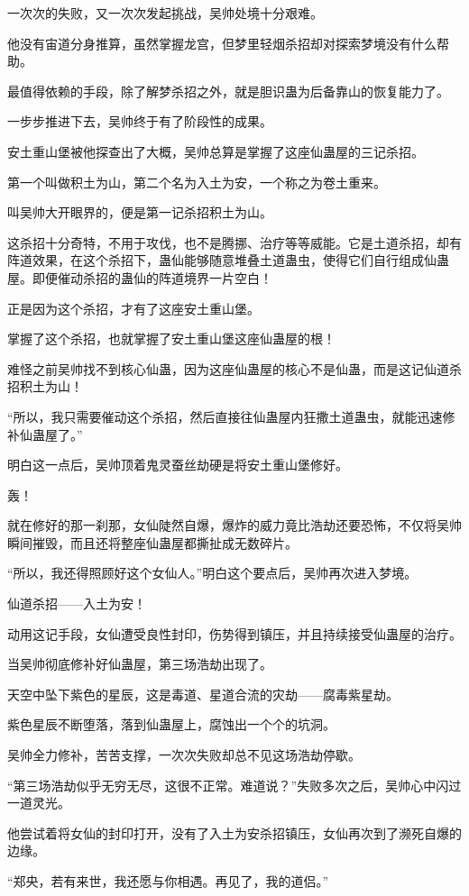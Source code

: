 \begin{this_body}
一次次的失败，又一次次发起挑战，吴帅处境十分艰难。

他没有宙道分身推算，虽然掌握龙宫，但梦里轻烟杀招却对探索梦境没有什么帮助。

最值得依赖的手段，除了解梦杀招之外，就是胆识蛊为后备靠山的恢复能力了。

一步步推进下去，吴帅终于有了阶段性的成果。

安土重山堡被他探查出了大概，吴帅总算是掌握了这座仙蛊屋的三记杀招。

第一个叫做积土为山，第二个名为入土为安，一个称之为卷土重来。

叫吴帅大开眼界的，便是第一记杀招积土为山。

这杀招十分奇特，不用于攻伐，也不是腾挪、治疗等等威能。它是土道杀招，却有阵道效果，在这个杀招下，蛊仙能够随意堆叠土道蛊虫，使得它们自行组成仙蛊屋。即便催动杀招的蛊仙的阵道境界一片空白！

正是因为这个杀招，才有了这座安土重山堡。

掌握了这个杀招，也就掌握了安土重山堡这座仙蛊屋的根！

难怪之前吴帅找不到核心仙蛊，因为这座仙蛊屋的核心不是仙蛊，而是这记仙道杀招积土为山！

“所以，我只需要催动这个杀招，然后直接往仙蛊屋内狂撒土道蛊虫，就能迅速修补仙蛊屋了。”

明白这一点后，吴帅顶着鬼灵蚕丝劫硬是将安土重山堡修好。

轰！

就在修好的那一刹那，女仙陡然自爆，爆炸的威力竟比浩劫还要恐怖，不仅将吴帅瞬间摧毁，而且还将整座仙蛊屋都撕扯成无数碎片。

“所以，我还得照顾好这个女仙人。”明白这个要点后，吴帅再次进入梦境。

仙道杀招——入土为安！

动用这记手段，女仙遭受良性封印，伤势得到镇压，并且持续接受仙蛊屋的治疗。

当吴帅彻底修补好仙蛊屋，第三场浩劫出现了。

天空中坠下紫色的星辰，这是毒道、星道合流的灾劫——腐毒紫星劫。

紫色星辰不断堕落，落到仙蛊屋上，腐蚀出一个个的坑洞。

吴帅全力修补，苦苦支撑，一次次失败却总不见这场浩劫停歇。

“第三场浩劫似乎无穷无尽，这很不正常。难道说？”失败多次之后，吴帅心中闪过一道灵光。

他尝试着将女仙的封印打开，没有了入土为安杀招镇压，女仙再次到了濒死自爆的边缘。

“郑央，若有来世，我还愿与你相遇。再见了，我的道侣。”


\end{this_body}
